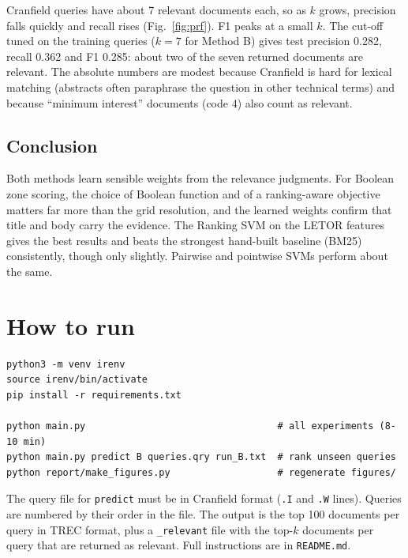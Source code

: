 \documentclass[11pt,a4paper]{article}
\newcommand{\code}[1]{\texttt{#1}}
\begin{document}
Cranfield queries have about 7 relevant documents each, so as $k$ grows, precision falls
quickly and recall rises (Fig.~\ref{fig:prf}). F1 peaks at a small $k$. The cut-off tuned on
the training queries ($k=7$ for Method B) gives test precision 0.282, recall 0.362 and F1
0.285: about two of the seven returned documents are relevant. The absolute numbers are
modest because Cranfield is hard for lexical matching (abstracts often paraphrase the
question in other technical terms) and because ``minimum interest'' documents (code 4) also
count as relevant.

\subsection{Conclusion}

Both methods learn sensible weights from the relevance judgments. For Boolean zone scoring,
the choice of Boolean function and of a ranking-aware objective matters far more than the
grid resolution, and the learned weights confirm that title and body carry the evidence. The
Ranking SVM on the LETOR features gives the best results and beats the strongest hand-built
baseline (BM25) consistently, though only slightly. Pairwise and pointwise SVMs perform
about the same.

\appendix
\section{How to run}

\begin{verbatim}
python3 -m venv irenv
source irenv/bin/activate
pip install -r requirements.txt

python main.py                                  # all experiments (8-10 min)
python main.py predict B queries.qry run_B.txt  # rank unseen queries
python report/make_figures.py                   # regenerate figures/
\end{verbatim}

\noindent The query file for \code{predict} must be in Cranfield format (\code{.I} and
\code{.W} lines). Queries are numbered by their order in the file. The output is the top 100
documents per query in TREC format, plus a \code{\_relevant} file with the top-$k$ documents
per query that are returned as relevant. Full instructions are in \code{README.md}.
\end{document}

